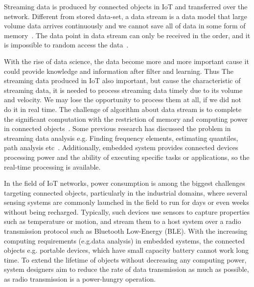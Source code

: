 Streaming data is produced by connected objects in IoT and transferred over the
network. Different from stored data-set, a data stream is a data model that
large volume data arrives continuously and we cannot save all of data in some
form of memory~\cite{o2002streaming}. The data point in data stream can only be
received in the order, and it is impossible to random access the
data~\cite{o2002streaming}.

With the rise of data science, the data become more and more important cause it
could provide knowledge and information after filter and learning. Thus The
streaming data produced in IoT also important, but cause the characteristic of
streaming data, it is needed to process streaming data timely due to its volume
and velocity. We may lose the opportunity to process them at all, if we did not
do it in real time. The challenge of algorithm about data stream is to complete
the significant computation with the restriction of memory and computing power
in connected objects~\cite{o2002streaming}. Some previous research has discussed
the problem in streaming data analysis e.g. Finding frequency elements,
estimating quantiles, path analysis etc~\cite{kejariwal2015real}. 
Additionally, embedded system provides connected devices processing power and
the ability of executing specific tasks or applications, so the real-time
processing is available. 


In the field of IoT networks, power consumption is among the biggest challenges
targeting connected objects, particularly in the industrial domains, where
several sensing systems are commonly launched in the field to run for days or
even weeks without being recharged. Typically, such devices use sensors to
capture properties such as temperature or motion, and stream them to a host
system over a radio transmission protocol such as Bluetooth Low-Energy (BLE).
With the increasing computing requirements (e.g.data analysis) in embedded
systems, the connected objects e.g. portable devices, which have small capacity
battery cannot work long time. To extend the lifetime of objects without
decreasing any computing power, system designers aim to reduce the rate of data
transmission as much as possible, as radio transmission is a power-hungry
operation.


